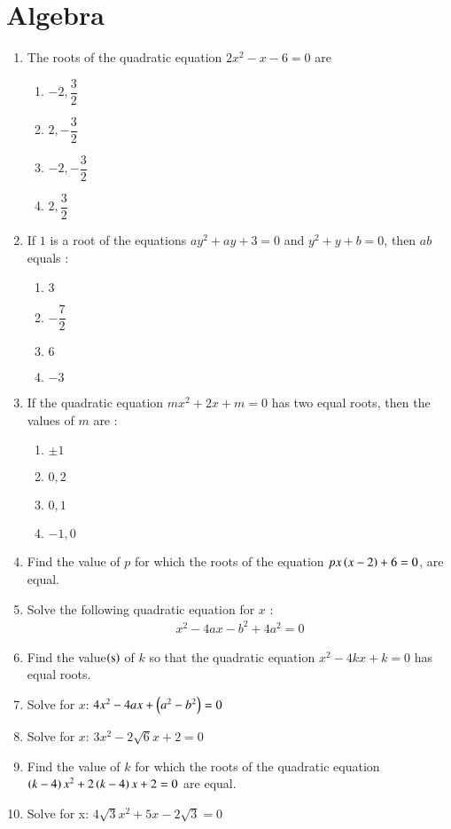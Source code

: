 \documentclass[journal,12pt,onecolumn]{IEEEtran}
\theoremstyle{remark}
\begin{document}
\section{Algebra}
\begin{enumerate}
\item The roots of the quadratic equation  $2x^2 - x - 6 = 0$ are 
\begin{enumerate}
\item $-2,\dfrac{3}{2}$ 
\item $2,-\dfrac{3}{2}$ 
\item $-2,-\dfrac{3}{2}$ 
\item $2,\dfrac{3}{2}$ 
\end{enumerate}
\item If $1$ is a root of the equations $ay^2 + ay + 3 = 0$ and $y^2 + y + b = 0$, then $ab$ equals : 
\begin{enumerate}
\item $3$ 
\item $-\dfrac{7}{2}$ 
\item $6$ 
\item $-3$ 
\end{enumerate}
\item If the quadratic equation $mx^2 + 2x + m = 0$ has two equal roots, then the values of $m$ are : 
\begin{enumerate}
\item $\pm 1$ 
\item $0,2$ 
\item $0,1$ 
\item $-1,0$ 
\end{enumerate}
\item Find the value of $p$ for which the roots of the equation $px\left(x-2\right) + 6 = 0$, are equal. 
\item Solve the following quadratic equation for $x$ : 
\begin{align}
x^2 - 4 a x - b^2 + 4a^2 = 0 
\end{align}
\item Find the value$\left(\text{s}\right)$ of $k$ so that the quadratic equation $x^2 - 4kx + k = 0$ has equal roots. 
\item Solve for $x$: $4x^2 - 4ax + \left(a^2 - b^2\right) = 0$ 
\item Solve for $x$: $3x^2 - 2\sqrt 6 x + 2 = 0$ 

\item Find the value of $k$ for which the roots of the quadratic equation $\left(k - 4\right) x^2 + 2\left(k-4\right) x + 2 =0$ are equal. 
\item Solve for x: 
$4\sqrt 3 x^2 + 5x - 2\sqrt 3 = 0$ 
\end{enumerate}
\end{document}
